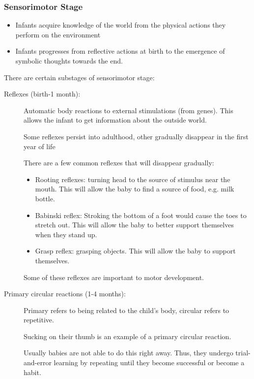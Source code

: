 \documentclass[../main/main.tex]{subfiles}
\begin{document}
\subsubsection{Sensorimotor Stage}
\begin{itemize}
\item Infants acquire knowledge of the world from the physical actions they perform on the environment
\item Infants progresses from reflective actions at birth to the emergence of symbolic thoughts towards the end.
\end{itemize}
There are certain substages of sensorimotor stage:
\begin{description}
  \item[Reflexes (birth-1 month):] Automatic body reactions to external stimulations (from genes). This allows the infant to get information about the outside world.
        \begin{remark}
Some reflexes persist into adulthood, other gradually disappear in the first year of life
        \end{remark}
        There are a few common reflexes that will disappear gradually:
        \begin{itemize}
          \item Rooting reflexes: turning head to the source of stimulus near the mouth. This will allow the baby to find a source of food, e.g. milk bottle.
          \item  Babinski reflex: Stroking the bottom of a foot would cause the toes to stretch out. This will allow the baby to better support themselves when they stand up.
                \item Grasp reflex: grasping objects. This will allow the baby to support themselves.
        \end{itemize}
        Some of these reflexes are important to motor development.
  \item[Primary circular reactions (1-4 months):]
        Primary refers to being related to the child's body, circular refers to repetitive.
        \begin{example}
Sucking on their thumb is an example of a primary circular reaction.
        \end{example}
        Usually babies are not able to do this right away. Thus, they undergo trial-and-error learning by repeating until they become successful or become a habit.


\end{description}
\end{document}
